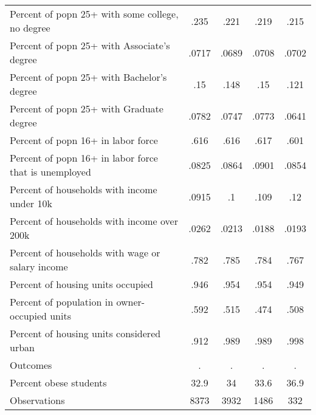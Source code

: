 {\begin{tabular}{l*{4}{c}}
Percent of popn 25+ with some college, no degree&        .235&        .221&        .219&        .215\\
Percent of popn 25+ with Associate's degree&       .0717&       .0689&       .0708&       .0702\\
Percent of popn 25+ with Bachelor's degree&         .15&        .148&         .15&        .121\\
Percent of popn 25+ with Graduate degree&       .0782&       .0747&       .0773&       .0641\\
Percent of popn 16+ in labor force&        .616&        .616&        .617&        .601\\
Percent of popn 16+ in labor force that is unemployed&       .0825&       .0864&       .0901&       .0854\\
Percent of households with income under 10k&       .0915&          .1&        .109&         .12\\
Percent of households with income over 200k&       .0262&       .0213&       .0188&       .0193\\
Percent of households with wage or salary income&        .782&        .785&        .784&        .767\\
Percent of housing units occupied&        .946&        .954&        .954&        .949\\
Percent of population in owner-occupied units&        .592&        .515&        .474&        .508\\
Percent of housing units considered urban&        .912&        .989&        .989&        .998\\
Outcomes            &           .&           .&           .&           .\\
Percent obese students&        32.9&          34&        33.6&        36.9\\
\hline
Observations        &        8373&        3932&        1486&         332\\
\hline\hline
\end{tabular}
}
